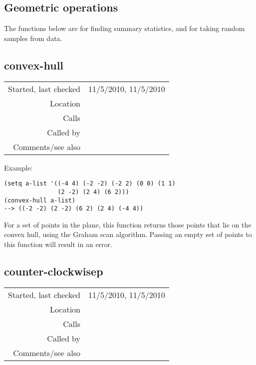 \subsection{Geometric operations}\label{sec:geometric-operations}

The functions below are for finding summary
statistics, and for taking random samples from
data.


\subsection*{convex-hull}\label{fun:convex-hull}

\vspace{0.3cm}
\begin{tabular}{r|p{8cm}}
Started, last checked & 11/5/2010, 11/5/2010 \\
Location & \nameref{sec:geometric-operations} \\
Calls & \\
Called by & \\
Comments/see also & 
\end{tabular}

\vspace{0.5cm}
\noindent Example:
\begin{verbatim}
(setq a-list '((-4 4) (-2 -2) (-2 2) (0 0) (1 1)
               (2 -2) (2 4) (6 2)))
(convex-hull a-list)
--> ((-2 -2) (2 -2) (6 2) (2 4) (-4 4))
\end{verbatim}

\noindent For a set of points in the plane, this
function returns those points that lie on the convex
hull, using the Graham scan algorithm. Passing an
empty set of points to this function will result in
an error.


\subsection*{counter-clockwisep}\label{fun:counter-clockwisep}

\vspace{0.3cm}
\begin{tabular}{r|p{8cm}}
Started, last checked & 11/5/2010, 11/5/2010 \\
Location & \nameref{sec:geometric-operations} \\
Calls & \\
Called by & \nameref{fun:convex-hull} \\
Comments/see also & 
\end{tabular}

